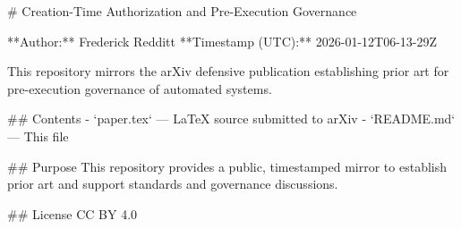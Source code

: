 # Creation-Time Authorization and Pre-Execution Governance

**Author:** Frederick Redditt  
**Timestamp (UTC):** 2026-01-12T06-13-29Z

This repository mirrors the arXiv defensive publication establishing prior art for
pre-execution governance of automated systems.

## Contents
- `paper.tex` — LaTeX source submitted to arXiv
- `README.md` — This file

## Purpose
This repository provides a public, timestamped mirror to establish prior art and
support standards and governance discussions.

## License
CC BY 4.0
